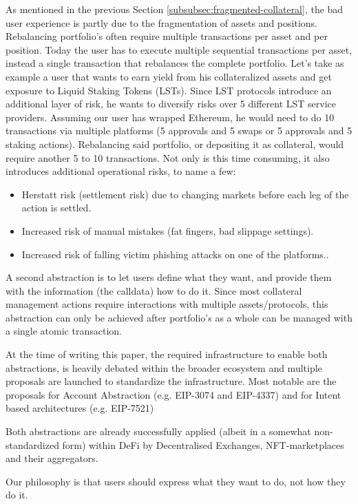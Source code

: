 \documentclass[sigconf,nonacm]{acmart}
\begin{document}
As mentioned in the previous Section \ref{subsubsec:fragmented-collateral}, the bad user experience is partly due to the fragmentation of assets and positions.
Rebalancing portfolio's often require multiple transactions per asset and per position.
Today the user has to execute multiple sequential transactions per asset, instead a single transaction that rebalances the complete portfolio.
Let's take as example a user that wants to earn yield from his collateralized assets and get exposure to Liquid Staking Tokens (LSTs).
Since LST protocols introduce an additional layer of risk, he wants to diversify risks over 5 different LST service providers.
Assuming our user has wrapped Ethereum, he would need to do 10 transactions via multiple platforms (5 approvals and 5 swaps or 5 approvals and 5 staking actions).
Rebalancing said portfolio, or depositing it as collateral, would require another 5 to 10 transactions.
Not only is this time consuming, it also introduces additional operational risks, to name a few:
 \begin{itemize}
    \item Herstatt risk (settlement risk) due to changing markets before each leg of the action is settled.
    \item Increased risk of manual mistakes (fat fingers, bad slippage settings).
    \item Increased risk of falling victim phishing attacks on one of the platforms.. 
\end{itemize}

A second abstraction is to let users define what they want, and provide them with the information (the calldata) how to do it.
Since most collateral management actions require interactions with multiple assets/protocols,
this abstraction can only be achieved after portfolio's as a whole can be managed with a single atomic transaction.

At the time of writing this paper, the required infrastructure to enable both abstractions, is heavily debated within the broader ecosystem and multiple proposals are launched to standardize the infrastructure.
Most notable are the proposals for Account Abstraction (e.g. EIP-3074 and EIP-4337) and for Intent based architectures (e.g. EIP-7521)

Both abstractions are already successfully applied (albeit in a somewhat non-standardized form) within DeFi by Decentralised Exchanges, NFT-marketplaces and their aggregators.

Our philosophy is that users should express what they want to do, not how they do it.
\end{document}
